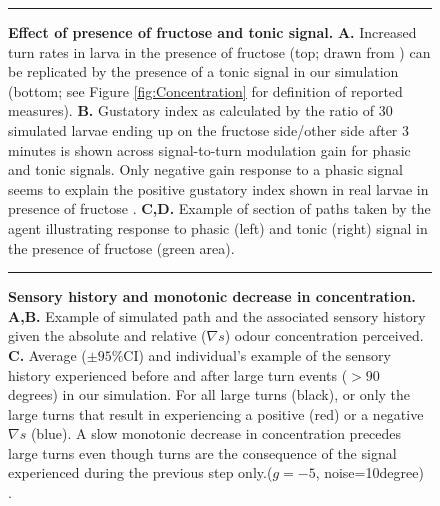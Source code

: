 \documentclass[11pt,a4paper]{article}
\newcommand{\todoBW}[1]{\todo[author=BW,color=orange, size=\tiny,inline]{#1}}
\begin{document}
\begin{figure}
\begin{center}
\caption{{\bf Effect of presence of fructose and tonic signal.}
{\bf A.} Increased turn rates in larva in the presence of fructose (top; drawn from \citep{schleyer2015learning}) can be replicated by the presence of a tonic signal in our simulation (bottom; see Figure \ref{fig:Concentration} for definition of reported measures). 
{\bf B.} Gustatory index as calculated by the ratio of 30 simulated larvae ending up on the fructose side/other side after 3 minutes is shown across signal-to-turn modulation gain for phasic and tonic signals. Only negative gain response to a phasic signal seems to explain the positive gustatory index shown in real larvae in presence of fructose \citep{schleyer2011behavior}.
{\bf C,D.} Example of section of paths taken by the agent illustrating response to phasic (left) and tonic (right) signal in the presence of fructose (green area).
\label{fig:Tonic}}
\hrule
\end{center}
\end{figure}


\begin{figure}
\begin{center}
\caption{{\bf Sensory history and monotonic decrease in concentration.} {\bf A,B.} Example of simulated path and the associated sensory history given the absolute and relative ($\nabla s$) odour concentration perceived.
{\bf  C.} Average ($\pm 95\%$CI) and individual’s example of the sensory history experienced before and after large turn events ($>90$ degrees) in our simulation. For all large turns (black), or only the large turns that result in experiencing a positive (red) or a negative $\nabla s$ (blue). A slow monotonic decrease in concentration precedes large turns even though turns are the consequence of the signal experienced during the previous step only.($g=-5$, noise=10degree) .
\label{fig:SensoryHistory}}
\hrule
\end{center}
\end{figure}
\end{document}
